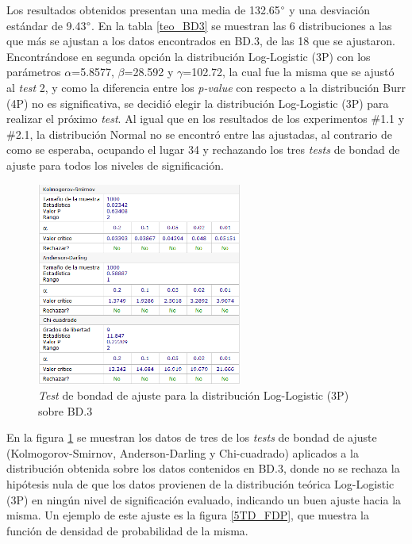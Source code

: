 \documentclass[12pt]{report}
\begin{document}
Los resultados obtenidos presentan una media de 132.65$\degree$ y una desviación estándar de 9.43$\degree$. En la tabla \ref{teo_BD3}  se muestran las 6 distribuciones a las que más se ajustan a los datos encontrados en BD.3, de las 18 que se ajustaron. Encontrándose en segunda opción la distribución Log-Logistic (3P) con los parámetros $\alpha$=5.8577, $\beta$=28.592 y $\gamma$=102.72, la cual fue la misma que se ajustó al \textit{test} 2, y como la diferencia entre los \textit{p-value} con respecto a la distribución Burr (4P) no es significativa, se decidió elegir la distribución Log-Logistic (3P) para realizar el próximo \textit{test}. Al igual que en los resultados de los experimentos \#1.1 y \#2.1, la distribución Normal no se encontró entre las ajustadas, al contrario de como se esperaba, ocupando el lugar 34 y rechazando los tres \textit{tests} de bondad de ajuste para todos los niveles de significación.
\begin{figure}[htbp]
	\centering
	
	\includegraphics[width=0.6\textwidth]{5td_bondad.png}
	\caption{\textit{Test} de bondad de ajuste para la distribución Log-Logistic (3P) sobre BD.3}
	\label{5TD_BONDAD}
\end{figure}


En la figura \ref{5TD_BONDAD} se  muestran los datos de tres de los \textit{tests} de bondad de ajuste (Kolmogorov-Smirnov, Anderson-Darling y Chi-cuadrado) aplicados a la distribución obtenida sobre los datos contenidos en BD.3, donde no se rechaza la hipótesis nula de que los datos provienen de la distribución teórica Log-Logistic (3P) en ningún nivel de significación evaluado, indicando un buen ajuste hacia la misma. Un ejemplo de este ajuste es la figura \ref{5TD_FDP}, que muestra la función de densidad de probabilidad de la misma. 
\end{document}
